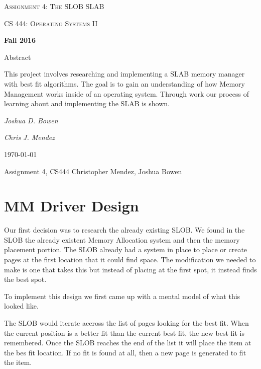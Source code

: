\documentclass[letterpaper,10pt,titlepage]{article}
\begin{document}
\begin{titlepage}
	\centering
	\vspace*{4cm}
	{\scshape\huge Assignment 4: The SLOB SLAB\par}
	\vspace{1cm}
	{\scshape\LARGE CS 444: Operating Systems II\par}
	\vspace{0.5cm}
	{\large\bfseries Fall 2016\par}
	{\large Abstract\par}
	\vspace {0.5cm}
		This project involves researching and implementing a SLAB memory manager with best fit algorithms. The goal is to gain an understanding of how Memory Management works inside of an operating system. Through work our process of learning about and implementing the SLAB is shown.
	\par
	\vspace{1cm}
	{\Large\itshape Joshua D. Bowen\par}
	{\Large\itshape Chris J. Mendez\par}
	\vfill
	{\large \today\par}	

\end{titlepage}

Assignment 4, CS444
Christopher Mendez, Joshua Bowen



\section{MM Driver Design}

Our first decision was to research the already existing SLOB.
We found in the SLOB the already existent Memory Allocation system and then the memory placement portion.
The SLOB already had a system in place to place or create pages at the first location that it could find space.
The modification we needed to make is one that takes this but instead of placing at the first spot, it instead finds the best spot.

To implement this design we first came up with a mental model of what this looked like.

The SLOB would iterate accross the list of pages looking for the best fit.
When the current position is a better fit than the current best fit, the new best fit is remembered.
Once the SLOB reaches the end of the list it will place the item at the bes fit location.
If no fit is found at all, then a new page is generated to fit the item.
\end{document}
